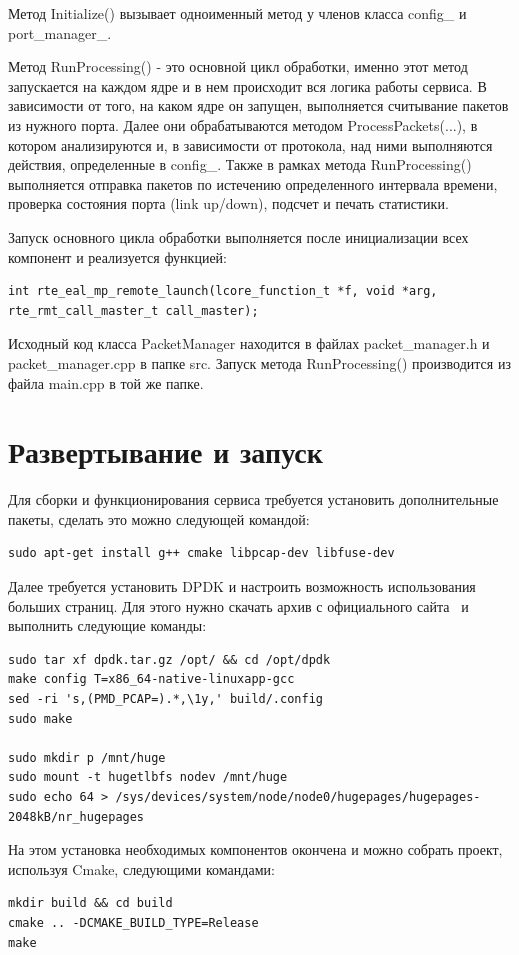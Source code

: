 Метод Initialize() вызывает одноименный метод у членов класса config\_ и port\_manager\_.

Метод RunProcessing() - это основной цикл обработки, именно этот метод  запускается на каждом ядре и в нем происходит вся логика работы сервиса. В зависимости от того, на каком ядре он запущен, выполняется считывание пакетов из нужного порта. Далее они обрабатываются методом ProcessPackets(...), в котором анализируются и, в зависимости от протокола, над ними выполняются действия, определенные в config\_. Также в рамках метода RunProcessing() выполняется отправка пакетов по истечению определенного интервала времени, проверка состояния порта (link up/down), подсчет и печать статистики.

Запуск основного цикла обработки выполняется после инициализации всех компонент и реализуется функцией:
\begin{lstlisting}
int rte_eal_mp_remote_launch(lcore_function_t *f, void *arg, rte_rmt_call_master_t call_master);
\end{lstlisting}

Исходный код класса PacketManager находится в файлах packet\_manager.h и packet\_manager.cpp в папке src. Запуск метода RunProcessing() производится из файла main.cpp в той же папке.

\section{Развертывание и запуск}
Для сборки и функционирования сервиса требуется установить дополнительные пакеты, сделать это можно следующей командой:
\begin{lstlisting}
sudo apt-get install g++ cmake libpcap-dev libfuse-dev
\end{lstlisting}

Далее требуется установить DPDK и настроить возможность использования больших страниц. Для этого нужно скачать архив с официального сайта~\cite{dpdk_descr} и выполнить следующие команды:
\begin{lstlisting}
sudo tar xf dpdk.tar.gz /opt/ && cd /opt/dpdk
make config T=x86_64-native-linuxapp-gcc
sed -ri 's,(PMD_PCAP=).*,\1y,' build/.config
sudo make

sudo mkdir p /mnt/huge
sudo mount -t hugetlbfs nodev /mnt/huge
sudo echo 64 > /sys/devices/system/node/node0/hugepages/hugepages-2048kB/nr_hugepages
\end{lstlisting}

На этом установка необходимых компонентов окончена и можно собрать проект, используя Cmake, следующими командами:
\begin{lstlisting}
mkdir build && cd build
cmake .. -DCMAKE_BUILD_TYPE=Release
make
\end{lstlisting}

